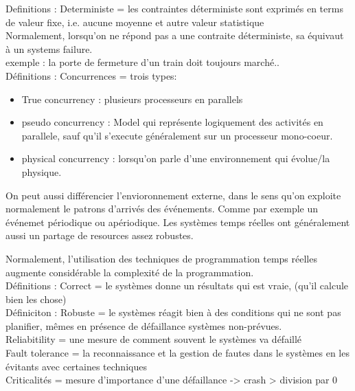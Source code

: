 \documentclass[oneside]{book}
\begin{document}
    Definitions : Deterministe = les contraintes déterministe sont exprimés en terms de valeur fixe, i.e. aucune moyenne et autre valeur statistique\\
    
    Normalement, lorsqu'on ne répond pas a une contraite déterministe, sa équivaut à un systems failure.\\
    
    exemple : la porte de fermeture d'un train doit toujours marché..\\
    
    Définitions : Concurrences  = trois types:
    \begin{itemize}
        \item True concurrency : plusieurs processeurs en parallels
        \item pseudo concurrency : Model qui représente logiquement des activités en parallele, sauf qu'il s'execute généralement sur un processeur mono-coeur.
        \item physical concurrency : lorsqu'on parle d'une environnement qui évolue/la physique.
    \end{itemize}
    On peut aussi différencier l'envioronnement externe, dans le sens qu'on exploite normalement le patrons d'arrivés des événements. Comme par exemple un événemet périodique ou apériodique. Les systèmes temps réelles ont généralement aussi un partage de resources assez robustes.
    
    Normalement, l'utilisation des techniques de programmation temps réelles augmente considérable la complexité de la programmation.\\
    
    Définitions : Correct = le systèmes donne un résultats qui est vraie, (qu'il calcule bien les chose)\\
    
    Définiciton : Robuste = le systèmes réagit bien à des conditions qui ne sont pas planifier, mêmes en présence de défaillance systèmes non-prévues.\\
    
    Reliabitility  = une mesure de comment souvent le systèmes va défaillé\\
    
    Fault tolerance  = la reconnaissance et la gestion de fautes dans le systèmes en les évitants avec certaines techniques\\
    
    Criticalités = mesure d'importance d'une défaillance -> crash > division par 0\\
    
\end{document}
